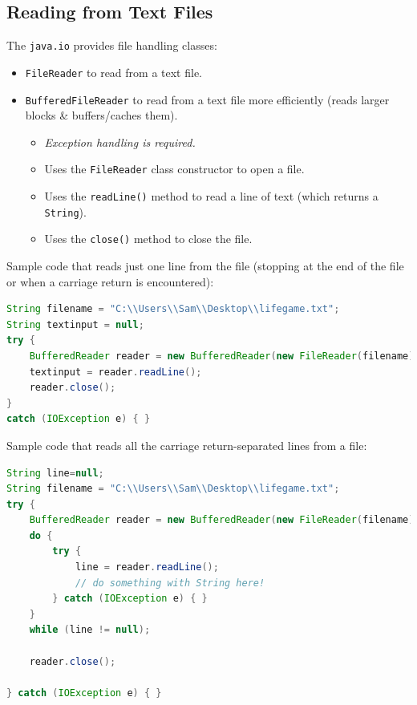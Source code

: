\documentclass[11pt]{article}
\begin{document}
\subsection{Reading from Text Files}
The \verb|java.io| provides file handling classes:
\begin{itemize}
    \item   \verb|FileReader| to read from a text file. 
    \item   \verb|BufferedFileReader| to read from a text file more efficiently (reads larger blocks \& buffers/caches them). 
            \begin{itemize}
                \item   \textit{Exception handling is required.}
                \item   Uses the \verb|FileReader| class constructor to open a file.
                \item   Uses the \verb|readLine()| method to read a line of text (which returns a \verb|String|).
                \item   Uses the \verb|close()| method to close the file.
            \end{itemize}
\end{itemize}

Sample code that reads just one line from the file (stopping at the end of the file or when a carriage return is encountered): 
\begin{lstlisting}[language=java]
String filename = "C:\\Users\\Sam\\Desktop\\lifegame.txt";
String textinput = null;
try {
    BufferedReader reader = new BufferedReader(new FileReader(filename));
    textinput = reader.readLine();
    reader.close();
} 
catch (IOException e) { }
\end{lstlisting}
    
Sample code that reads all the carriage return-separated lines from a file: 
\begin{lstlisting}[language=java]
String line=null;
String filename = "C:\\Users\\Sam\\Desktop\\lifegame.txt";
try {
    BufferedReader reader = new BufferedReader(new FileReader(filename));
    do {
        try {
            line = reader.readLine();
            // do something with String here!
        } catch (IOException e) { }
    }
    while (line != null);

    reader.close();

} catch (IOException e) { }
\end{lstlisting}
\end{document}
